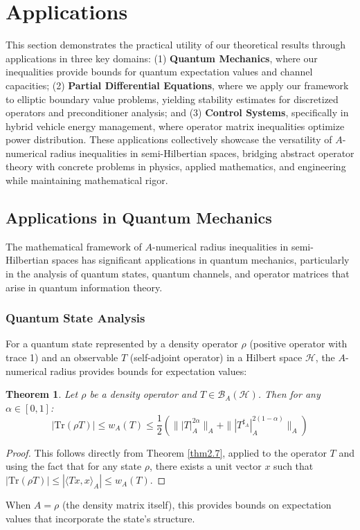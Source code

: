 \documentclass{article}
\newtheorem{theorem}{Theorem}[section]
\begin{document}
\section{Applications}

This section demonstrates the practical utility of our theoretical results through applications in three key domains: (1) \textbf{Quantum Mechanics}, where our inequalities provide bounds for quantum expectation values and channel capacities; (2) \textbf{Partial Differential Equations}, where we apply our framework to elliptic boundary value problems, yielding stability estimates for discretized operators and preconditioner analysis; and (3) \textbf{Control Systems}, specifically in hybrid vehicle energy management, where operator matrix inequalities optimize power distribution. These applications collectively showcase the versatility of $A$-numerical radius inequalities in semi-Hilbertian spaces, bridging abstract operator theory with concrete problems in physics, applied mathematics, and engineering while maintaining mathematical rigor.

\subsection{Applications in Quantum Mechanics}\hfill
\label{sec:quantum_applications}

The mathematical framework of $A$-numerical radius inequalities in semi-Hilbertian spaces has significant applications in quantum mechanics, particularly in the analysis of quantum states, quantum channels, and operator matrices that arise in quantum information theory.

\subsubsection{Quantum State Analysis}

For a quantum state represented by a density operator $\rho$ (positive operator with trace 1) and an observable $T$ (self-adjoint operator) in a Hilbert space $\mathcal{H}$, the $A$-numerical radius provides bounds for expectation values:
\begin{theorem}
Let $\rho$ be a density operator and $T \in \mathcal{B}_A(\mathcal{H})$. Then for any $\alpha \in [0,1]$:
\[
|\mathrm{Tr}(\rho T)| \leq w_A(T) \leq \frac{1}{2}\left(\||T|_A^{2\alpha}\|_A + \||T^{\sharp_A}|_A^{2(1-\alpha)}\|_A\right)
\]
\end{theorem}
\begin{proof}
This follows directly from Theorem \ref{thm2.7}, applied to the operator $T$ and using the fact that for any state $\rho$, there exists a unit vector $x$ such that $|\mathrm{Tr}(\rho T)| \leq |\langle Tx,x\rangle_A| \leq w_A(T)$.
\end{proof}
When $A = \rho$ (the density matrix itself), this provides bounds on expectation values that incorporate the state's structure.
\end{document}
